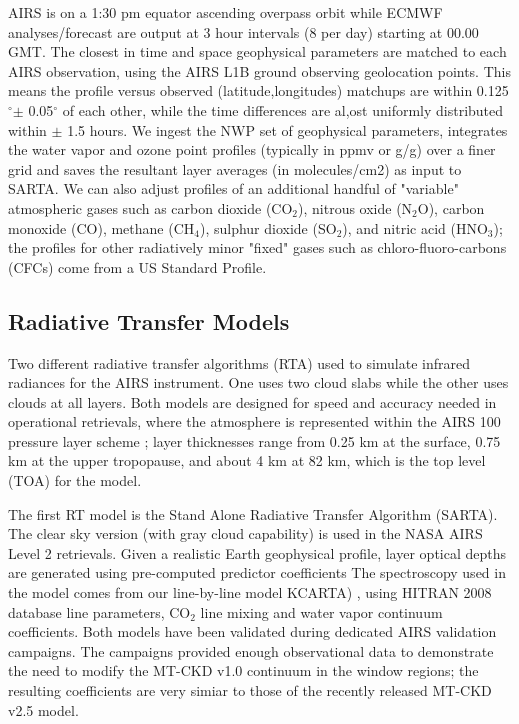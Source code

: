 \documentclass[agupp]{aguplus}              %
\newcommand{\ch}{CH$_4$\xspace}
\newcommand{\cd}{CO$_2$\xspace}
\newcommand{\nit}{N$_2$O\xspace}
\newcommand{\co}{CO\xspace}
\newcommand{\so}{SO$_2$\xspace}
\newcommand{\hno}{HNO$_3$\xspace}
\newcommand{\mydeg}{\mbox{$^\circ$}}
\begin{document}
\begin{article}
AIRS is on a 1:30 pm equator ascending overpass orbit while ECMWF
analyses/forecast are output at 3 hour intervals (8 per day) starting
at 00.00 GMT.  The closest in time and space geophysical parameters
are matched to each AIRS observation, using the AIRS L1B ground
observing geolocation points.  This means the profile versus observed
(latitude,longitudes) matchups are within 0.125\mydeg $\pm$ 0.05\mydeg
of each other, while the time differences are al,ost uniformly
distributed within $\pm$ 1.5 hours. We ingest the NWP
set of geophysical parameters, integrates the water vapor and ozone
point profiles (typically in ppmv or g/g) over a finer grid and saves
the resultant layer averages (in molecules/cm2) as input to SARTA. We
can also adjust profiles of an additional handful of "variable"
atmospheric gases such as carbon dioxide (\cd), nitrous oxide (\nit),
carbon monoxide (\co), methane (\ch), sulphur dioxide (\so), and
nitric acid (\hno); the profiles for other radiatively minor "fixed"
gases such as chloro-fluoro-carbons (CFCs) come from a US Standard
Profile.

\subsection{Radiative Transfer Models}

Two different radiative transfer algorithms (RTA) used to simulate
infrared radiances for the AIRS instrument. One uses two cloud slabs
while the other uses clouds at all layers. Both models are designed
for speed and accuracy needed in operational retrievals, where the
atmosphere is represented within the AIRS 100 pressure layer scheme
\citep{str:02*2}; layer thicknesses range from 0.25 km at the surface,
0.75 km at the upper tropopause, and about 4 km at 82 km, which is the
top level (TOA) for the model.

The first RT model is the Stand Alone Radiative Transfer Algorithm
(SARTA). The clear sky version (with gray cloud capability) is used in
the NASA AIRS Level 2 retrievals. Given a realistic Earth geophysical
profile, layer optical depths are generated using pre-computed
predictor coefficients \citep{aum:02*2,str:02*2,str:06*1} The
spectroscopy used in the model comes from our line-by-line model
\textsf{KCARTA}) \citep{mac:02*1}, using HITRAN 2008 database
\citep{rot:04} line parameters, \cd line mixing and water vapor
continuum coefficients. Both models have been validated during
dedicated AIRS validation campaigns. The campaigns provided enough
observational data to demonstrate the need to modify the MT-CKD v1.0
continuum \citep{clo:95*1,clo:05} in the window regions; the resulting
coefficients are very simiar to those of the recently released MT-CKD
v2.5 model.


\end{article}
\end{document}
